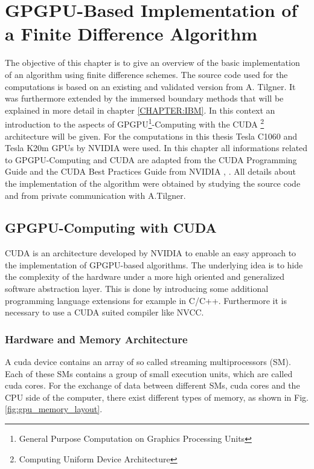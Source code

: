 \chapter[ GPGPU-Based Implementation of a Finite Difference Algorithm]{GPGPU-Based Implementation of \\ a Finite Difference Algorithm}

\label{CHAPTER:CUDA}

The objective of this chapter is to give an overview of the basic implementation of an algorithm using finite difference schemes.
The source code used for the computations is based on an existing and validated version from A. Tilgner.
It was furthermore extended by the immersed boundary methods that will be explained in more detail in chapter \ref{CHAPTER:IBM}.
In this context an introduction to the aspects of GPGPU\footnote{General Purpose Computation on Graphics Processing Units}-Computing
with the CUDA \footnote{Computing Uniform Device Architecture} architecture will be given.
For the computations in this thesis Tesla C1060 and Tesla K20m GPUs by NVIDIA were used. %
In this chapter all informations related to GPGPU-Computing and CUDA are adapted from the CUDA Programming Guide and the CUDA Best Practices Guide from NVIDIA
\citep{CUDAPG}, \citep{CUDABP}. All details about the implementation of the algorithm were obtained by studying the source code
and from private communication with A.Tilgner.

\section{GPGPU-Computing with CUDA}

CUDA is an architecture developed by NVIDIA to enable an easy approach to the implementation of GPGPU-based algorithms.
The underlying idea is to hide the complexity of the hardware under a more high oriented and generalized software abstraction layer.
This is done by introducing some additional programming language extensions for example in C/C++.
Furthermore it is necessary to use a CUDA suited compiler like NVCC.

\subsection{Hardware and Memory Architecture}

A cuda device contains an array of so called streaming multiprocessors (SM).
Each of these SMs contains a group of small execution units, which are called cuda cores.
For the exchange of data between different SMs, cuda cores and the CPU side of the computer, there exist different
types of memory, as shown  in Fig.  \ref{fig:gpu_memory_layout}.
\newpage

